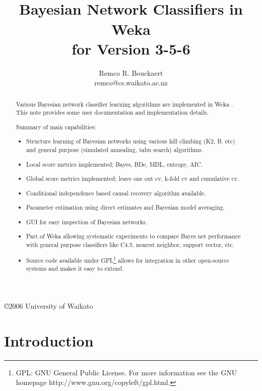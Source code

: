 \documentclass[a4paper]{article}
\title{\epsfig{file=images/coat_of_arms.eps,width=10cm}\vspace{3cm}\\Bayesian Network Classifiers in Weka\\for Version 3-5-6}
\author{Remco R. Bouckaert\\remco@cs.waikato.ac.nz}
\begin{document}
\begin{titlepage}

\maketitle
\thispagestyle{empty}

\center
\vspace{8cm}

\copyright 2006 University of Waikato

\end{titlepage}

\begin{abstract}
Various Bayesian network classifier learning algorithms are implemented in Weka \cite{weka}.
This note provides some user documentation and implementation details.

Summary of main capabilities:
\begin{itemize}
  \item Structure learning of Bayesian networks using various hill climbing (K2, B, etc) and
general purpose (simulated annealing, tabu search) algorithms.
  \item Local score metrics implemented; Bayes, BDe, MDL, entropy, AIC.
  \item Global score metrics implemented; leave one out cv, k-fold cv and cumulative cv.
  \item Conditional independence based causal recovery algorithm available.
  \item Parameter estimation using direct estimates and Bayesian model averaging.
  \item GUI for easy inspection of Bayesian networks.
  \item Part of Weka allowing systematic experiments to compare Bayes net performance with general 
purpose classifiers like C4.5, nearest neighbor, support vector, etc.
  \item Source code available under GPL\footnote{GPL: GNU General Public License. For more information see the GNU homepage http://www.gnu.org/copyleft/gpl.html.} allows for integration in other open-source systems and makes it easy to extend.
\end{itemize}
\end{abstract}
\newpage

\tableofcontents
\newpage

\section{Introduction}
\end{document}
